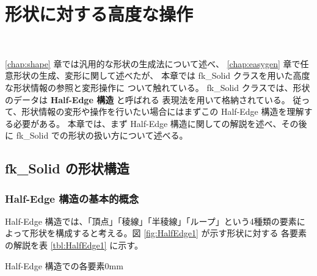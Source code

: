 \chapter{形状に対する高度な操作} \label{chap:solid} ~

\ref{chap:shape} 章では汎用的な形状の生成法について述べ、
\ref{chap:easygen} 章で任意形状の生成、変形に関して述べたが、
本章では fk\_Solid クラスを用いた高度な形状情報の参照と変形操作に
ついて触れている。
fk\_Solid クラスでは、形状のデータは \textbf{Half-Edge 構造} と呼ばれる
表現法を用いて格納されている。
従って、形状情報の変形や操作を行いたい場合にはまずこの
Half-Edge 構造を理解する必要がある。
本章では、まず Half-Edge 構造に関しての解説を述べ、その後に
fk\_Solid での形状の扱い方について述べる。
\section{fk\_Solid の形状構造}
\subsection{Half-Edge 構造の基本的概念}
Half-Edge 構造では、「頂点」「稜線」「半稜線」「ループ」という4種類の要素に
よって形状を構成すると考える。図 \ref{fig:HalfEdge1} が示す形状に対する
各要素の解説を表 \ref{tbl:HalfEdge1} に示す。

	{Half-Edge 構造での各要素}{0mm}

